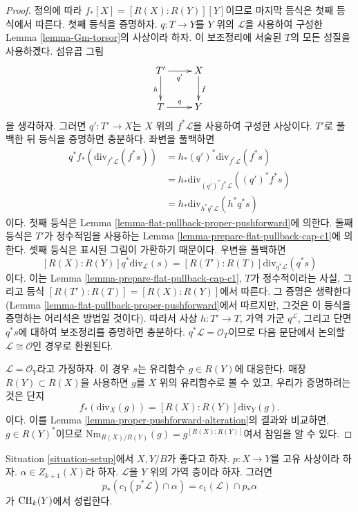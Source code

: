 \begin{proof}
정의에 따라 $f_*[X] = [R(X) : R(Y)][Y]$이므로 마지막 등식은 첫째
등식에서 따른다.
첫째 등식을 증명하자. $q : T \to Y$를 $Y$ 위의 $\mathcal{L}$을
사용하여 구성한 Lemma \ref{lemma-Gm-torsor}의 사상이라 하자.
이 보조정리에 서술된 $T$의 모든 성질을 사용하겠다. 섬유곱 그림
$$
\xymatrix{
T' \ar[r]_{q'} \ar[d]_h & X \ar[d]^f \\
T \ar[r]^q & Y
}
$$
을 생각하자. 그러면 $q' : T' \to X$는 $X$ 위의
$f^*\mathcal{L}$을 사용하여 구성한 사상이다.
$T'$로 풀백한 뒤 등식을 증명하면 충분하다. 좌변을 풀백하면
\begin{align*}
q^*f_*\left(\text{div}_{f^*\mathcal{L}}(f^*s)\right)
& =
h_*(q')^*\text{div}_{f^*\mathcal{L}}(f^*s) \\
& =
h_*\text{div}_{(q')^*f^*\mathcal{L}}((q')^*f^*s) \\
& =
h_*\text{div}_{h^*q^*\mathcal{L}}(h^*q^*s)
\end{align*}
이다. 첫째 등식은 Lemma \ref{lemma-flat-pullback-proper-pushforward}에
의한다. 둘째 등식은 $T'$가 정수적임을 사용하는 Lemma
\ref{lemma-prepare-flat-pullback-cap-c1}에 의한다. 셋째 등식은 표시된
그림이 가환하기 때문이다. 우변을 풀백하면
$$
[R(X) : R(Y)]q^*\text{div}_\mathcal{L}(s) =
[R(T') : R(T)]\text{div}_{q^*\mathcal{L}}(q^*s)
$$
이다. 이는 Lemma \ref{lemma-prepare-flat-pullback-cap-c1}, $T$가
정수적이라는 사실, 그리고 등식
$[R(T') : R(T)] = [R(X) : R(Y)]$에서 따른다. 그 증명은 생략한다
(Lemma \ref{lemma-flat-pullback-proper-pushforward}에서 따르지만,
그것은 이 등식을 증명하는 어리석은 방법일 것이다). 따라서 사상
$h : T' \to T$, 가역 가군
$q^\mathcal{L}$, 그리고 단면 $q^*s$에 대하여 보조정리를 증명하면
충분하다. $q^*\mathcal{L} = \mathcal{O}_T$이므로 다음 문단에서 논의할
$\mathcal{L} \cong \mathcal{O}$인 경우로 환원된다.

\medskip\noindent
$\mathcal{L} = \mathcal{O}_Y$라고 가정하자. 이 경우 $s$는 유리함수
$g \in R(Y)$에 대응한다. 매장 $R(Y) \subset R(X)$을 사용하면
$g$를 $X$ 위의 유리함수로 볼 수 있고, 우리가 증명하려는 것은 단지
$$
f_*\left(\text{div}_X(g)\right) = [R(X) : R(Y)]\text{div}_Y(g).
$$
이다. 이를 Lemma \ref{lemma-proper-pushforward-alteration}의 결과와
비교하면, $g \in R(Y)^*$이므로
$\text{Nm}_{R(X)/R(Y)}(g) = g^{[R(X) : R(Y)]}$여서 참임을 알 수 있다.
\end{proof}

\begin{lemma}
\label{lemma-pushforward-cap-c1}
Situation \ref{situation-setup}에서 $X, Y/B$가 좋다고 하자.
$p : X \to Y$를 고유 사상이라 하자.
$\alpha \in Z_{k + 1}(X)$라 하자.
$\mathcal{L}$을 $Y$ 위의 가역 층이라 하자. 그러면
$$
p_*(c_1(p^*\mathcal{L}) \cap \alpha) = c_1(\mathcal{L}) \cap p_*\alpha
$$
가 $\mathop{\mathrm{CH}}\nolimits_k(Y)$에서 성립한다.
\end{lemma}

